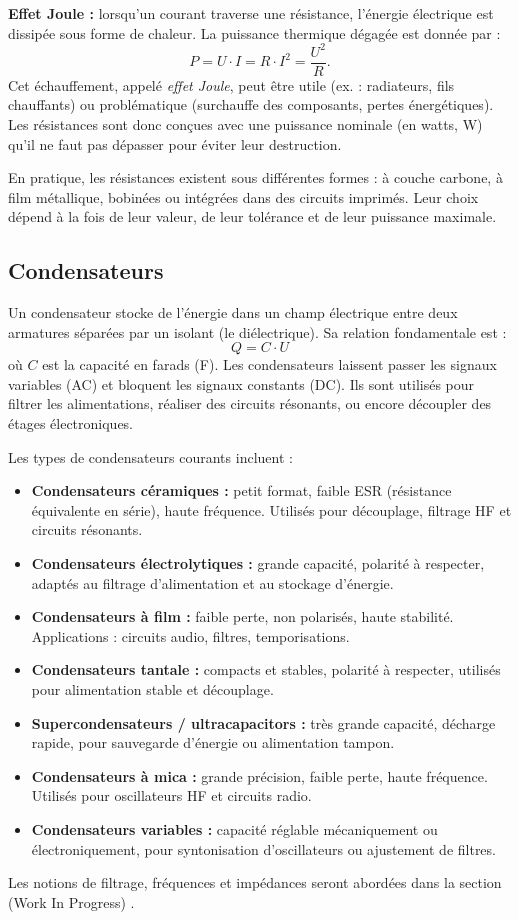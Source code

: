 \textbf{Effet Joule :} lorsqu’un courant traverse une résistance, l’énergie
électrique est dissipée sous forme de chaleur. La puissance thermique dégagée
est donnée par :
\[
P = U \cdot I = R \cdot I^2 = \frac{U^2}{R}.
\]
Cet échauffement, appelé \emph{effet Joule}, peut être utile (ex. : radiateurs,
fils chauffants) ou problématique (surchauffe des composants, pertes énergétiques).
Les résistances sont donc conçues avec une puissance nominale (en watts, \unit{\watt})
qu’il ne faut pas dépasser pour éviter leur destruction.

En pratique, les résistances existent sous différentes formes :
à couche carbone, à film métallique, bobinées ou intégrées dans des circuits imprimés.
Leur choix dépend à la fois de leur valeur, de leur tolérance et de leur puissance maximale.

\subsection{Condensateurs} \label{subsec:capacitors}
Un condensateur stocke de l’énergie dans un champ électrique
entre deux armatures séparées par un isolant (le diélectrique).
Sa relation fondamentale est :
\[
Q = C \cdot U
\]
où \(C\) est la capacité en farads (\unit{\farad}).
Les condensateurs laissent passer les signaux variables (AC)
et bloquent les signaux constants (DC).
Ils sont utilisés pour filtrer les alimentations,
réaliser des circuits résonants, ou encore découpler des étages électroniques.

Les types de condensateurs courants incluent :
\begin{itemize}
  \item \textbf{Condensateurs céramiques :} petit format, faible ESR (r\'esistance \'equivalente en s\'erie), haute fréquence.
        Utilisés pour découplage, filtrage HF et circuits résonants.
  \item \textbf{Condensateurs électrolytiques :} grande capacité, polarité à respecter,
        adaptés au filtrage d’alimentation et au stockage d’énergie.
  \item \textbf{Condensateurs à film :} faible perte, non polarisés, haute stabilité.
        Applications : circuits audio, filtres, temporisations.
  \item \textbf{Condensateurs tantale :} compacts et stables, polarité à respecter,
        utilisés pour alimentation stable et découplage.
  \item \textbf{Supercondensateurs / ultracapacitors :} très grande capacité, décharge rapide,
        pour sauvegarde d’énergie ou alimentation tampon.
  \item \textbf{Condensateurs à mica :} grande précision, faible perte, haute fréquence.
        Utilisés pour oscillateurs HF et circuits radio.
  \item \textbf{Condensateurs variables :} capacité réglable mécaniquement ou électroniquement,
        pour syntonisation d’oscillateurs ou ajustement de filtres.
\end{itemize}
\begin{Note}
	Les notions de filtrage, fr\'equences et impédances seront abordées dans la section (Work In Progress) .
\end{Note}

